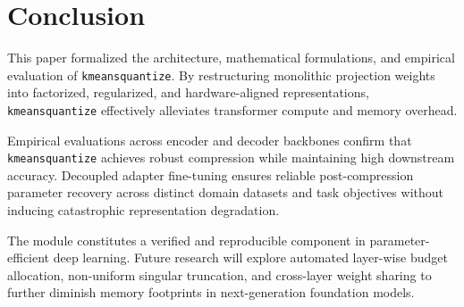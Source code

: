 \section{Conclusion}
This paper formalized the architecture, mathematical formulations, and empirical evaluation of \texttt{kmeansquantize}. By restructuring monolithic projection weights into factorized, regularized, and hardware-aligned representations, \texttt{kmeansquantize} effectively alleviates transformer compute and memory overhead.

Empirical evaluations across encoder and decoder backbones confirm that \texttt{kmeansquantize} achieves robust compression while maintaining high downstream accuracy. Decoupled adapter fine-tuning ensures reliable post-compression parameter recovery across distinct domain datasets and task objectives without inducing catastrophic representation degradation.

The module constitutes a verified and reproducible component in parameter-efficient deep learning. Future research will explore automated layer-wise budget allocation, non-uniform singular truncation, and cross-layer weight sharing to further diminish memory footprints in next-generation foundation models.
